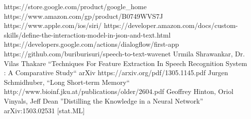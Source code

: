 \documentclass[conference]{IEEEtran}
\begin{document}
\begin{thebibliography}{00}
 https://store.google.com/product/google\_home
 https://www.amazon.com/gp/product/B0749WVS7J
 https://www.apple.com/ios/siri/
 https://developer.amazon.com/docs/custom-skills/define-the-interaction-model-in-json-and-text.html
 https://developers.google.com/actions/dialogflow/first-app
 https://github.com/buriburisuri/speech-to-text-wavenet
 Urmila Shrawankar, Dr. Vilas Thakare ``Techniques For Feature Extraction In Speech Recognition System : A Comparative Study`` arXiv https://arxiv.org/pdf/1305.1145.pdf
 Jurgen Schmidhuber, ``Long Short-term Memory`` http://www.bioinf.jku.at/publications/older/2604.pdf
 Geoffrey Hinton, Oriol Vinyals, Jeff Dean ''Distilling the Knowledge in a Neural Network'' arXiv:1503.02531 [stat.ML]
\end{thebibliography}
\vspace{12pt}
\end{document}
